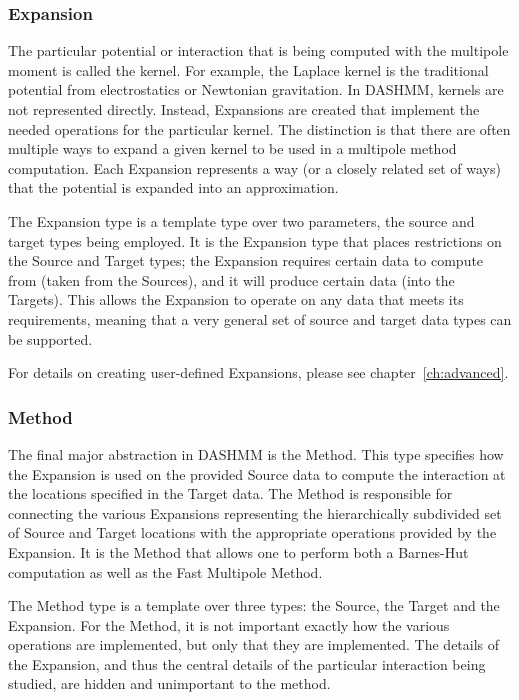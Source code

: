 \subsubsection{Expansion}

The particular potential or interaction that is being computed with
the multipole moment is called the kernel. For example, the Laplace
kernel is the traditional potential from electrostatics or Newtonian
gravitation. In DASHMM, kernels are not represented directly. Instead,
Expansions are created that implement the needed operations for the
particular kernel. The distinction is that there are often multiple
ways to expand a given kernel to be used in a multipole method
computation. Each Expansion represents a way (or a closely related set
of ways) that the potential is expanded into an approximation.

The Expansion type is a template type over two parameters, the source
and target types being employed. It is the Expansion type that places
restrictions on the Source and Target types; the Expansion requires
certain data to compute from (taken from the Sources), and it will
produce certain data (into the Targets). This allows the Expansion to
operate on any data that meets its requirements, meaning that a very
general set of source and target data types can be supported.

For details on creating user-defined Expansions, please see
chapter~\ref{ch:advanced}.

\subsubsection{Method}
The final major abstraction in DASHMM is the Method. This type
specifies how the Expansion is used on the provided Source data to
compute the interaction at the locations specified in the Target
data. The Method is responsible for connecting the various Expansions
representing the hierarchically subdivided set of Source and Target
locations with the appropriate operations provided by the
Expansion. It is the Method that allows one to perform both a
Barnes-Hut computation as well as the Fast Multipole Method.

The Method type is a template over three types: the Source, the Target
and the Expansion. For the Method, it is not important exactly how the
various operations are implemented, but only that they are
implemented. The details of the Expansion, and thus the central
details of the particular interaction being studied, are hidden and
unimportant to the method.

